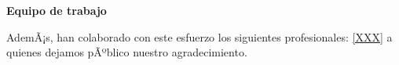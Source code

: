 \begin{center}
{\bf \Huge Equipo de trabajo}
\end{center}
\vspace{1cm}







AdemÃ¡s, han colaborado con este esfuerzo los siguientes profesionales: \ref{XXX} a quienes dejamos pÃºblico nuestro agradecimiento.
